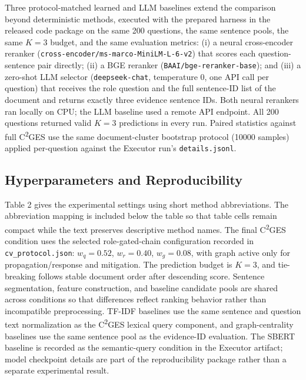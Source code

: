 \documentclass{ieeeaccess}
\begin{document}
Three protocol-matched learned and LLM baselines extend the comparison beyond deterministic methods, executed with the prepared harness in the released code package on the same 200 questions, the same sentence pools, the same \(K=3\) budget, and the same evaluation metrics: (i) a neural cross-encoder reranker (\texttt{cross-encoder/ms-marco-MiniLM-L-6-v2}) that scores each question-sentence pair directly; (ii) a BGE reranker (\texttt{BAAI/bge-reranker-base}); and (iii) a zero-shot LLM selector (\texttt{deepseek-chat}, temperature 0, one API call per question) that receives the role question and the full sentence-ID list of the document and returns exactly three evidence sentence IDs. Both neural rerankers ran locally on CPU; the LLM baseline used a remote API endpoint. All 200 questions returned valid \(K=3\) predictions in every run. Paired statistics against full C\textsuperscript{2}GES use the same document-cluster bootstrap protocol (10000 samples) applied per-question against the Executor run's \texttt{details.jsonl}.

\subsection{Hyperparameters and Reproducibility}

\label{sec:hyperparameters_and_reproducibility}

Table 2 gives the experimental settings using short method abbreviations. The abbreviation mapping is included below the table so that table cells remain compact while the text preserves descriptive method names. The final C\textsuperscript{2}GES condition uses the selected role-gated-chain configuration recorded in \texttt{cv\_protocol.json}: \(w_q=0.52\), \(w_r=0.40\), \(w_g=0.08\), with graph active only for propagation/response and mitigation. The prediction budget is \(K=3\), and tie-breaking follows stable document order after descending score. Sentence segmentation, feature construction, and baseline candidate pools are shared across conditions so that differences reflect ranking behavior rather than incompatible preprocessing. TF-IDF baselines use the same sentence and question text normalization as the C\textsuperscript{2}GES lexical query component, and graph-centrality baselines use the same sentence pool as the evidence-ID evaluation. The SBERT baseline is recorded as the semantic-query condition in the Executor artifact; model checkpoint details are part of the reproducibility package rather than a separate experimental result.
\end{document}
